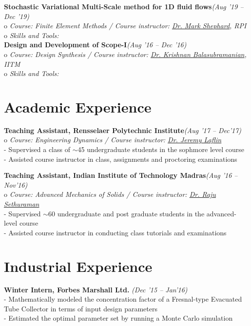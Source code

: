 \documentclass[margin,line]{res}
\begin{document}
\begin{resume}
\textbullet\hspace{0.005cm} {\bf Stochastic Variational Multi-Scale method for 1D fluid flows}\hfill {\em (Aug '19 -- Dec '19)}\\
o {\em Course: Finite Element Methods / Course instructor: \href {https://www.scorec.rpi.edu/researchers_shephard.php} {\color{RoyalPurple} Dr. Mark Shephard}, RPI}\\
o {\em Skills and Tools:  }\\

\textbullet\hspace{0.005cm} {\bf Design and Development of Scope-I}\hfill {\em (Aug '16 -- Dec '16)}\\
o {\em Course: Design Synthesis / Course instructor: \href {https://mech.iitm.ac.in/meiitm/personnal/krishnan-balasubramanian/} {\color{RoyalPurple} Dr. Krishnan Balasubramanian}, IITM}\\
o {\em Skills and Tools:  }\\

\section {\sc Academic Experience}
\textbullet\hspace{0.005cm} {\bf Teaching Assistant, Rensselaer Polytechnic Institute}\hfill {\em (Aug '17 -- Dec'17)}\\
o {\em Course: Engineering Dynamics / Course instructor: \href {} {\color{RoyalPurple} Dr. Jeremy Laflin}}\\
- Supervised a class of $\sim$45 undergraduate students in the sophmore level course\\
- Assisted course instructor in class, assignments and proctoring examinations

\textbullet\hspace{0.005cm} {\bf Teaching Assistant, Indian Institute of Technology Madras}\hfill {\em (Aug '16 -- Nov'16)}\\
o {\em Course: Advanced Mechanics of Solids / Course instructor: \href {https://mech.iitm.ac.in/meiitm/personnal/raju-sethuraman/} {\color{RoyalPurple} Dr. Raju Sethuraman}}\\
- Supervised $\sim$60 undergraduate and post graduate students in the advanced-level course\\
- Assisted course instructor in conducting class tutorials and examinations

\section {\sc Industrial Experience}
\textbullet\hspace{0.005cm} {\bf Winter Intern, Forbes Marshall Ltd. }\hfill {\em (Dec '15 -- Jan'16)}\\
- Mathematically modeled the concentration factor of a Fresnal-type Evacuated Tube Collector in terms of input design parameters\\
- Estimated the optimal parameter set by running a Monte Carlo simulation


\end{resume}
\end{document}
